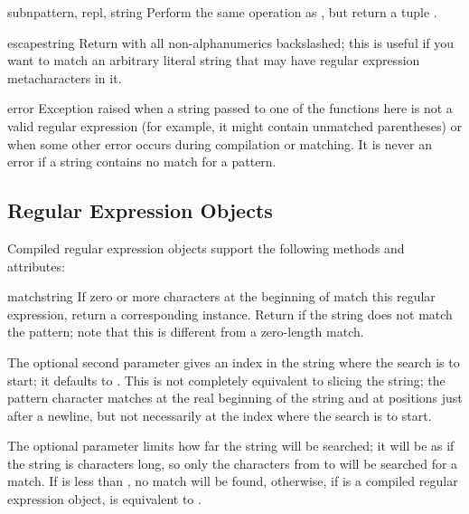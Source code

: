 \begin{funcdesc}{subn}{pattern, repl, string}
  Perform the same operation as , but return a tuple
  .
\end{funcdesc}

\begin{funcdesc}{escape}{string}
  Return  with all non-alphanumerics backslashed; this is
  useful if you want to match an arbitrary literal string that may have
  regular expression metacharacters in it.
\end{funcdesc}

\begin{excdesc}{error}
  Exception raised when a string passed to one of the functions here
  is not a valid regular expression (for example, it might contain
  unmatched parentheses) or when some other error occurs during
  compilation or matching.  It is never an error if a string contains
  no match for a pattern.
\end{excdesc}


\subsection{Regular Expression Objects \label{re-objects}}

Compiled regular expression objects support the following methods and
attributes:

\begin{methoddesc}[RegexObject]{match}{string}
  If zero or more characters at the beginning of  match
  this regular expression, return a corresponding
   instance.  Return  if the string does not
  match the pattern; note that this is different from a zero-length
  match.


  The optional second parameter  gives an index in the string
  where the search is to start; it defaults to .  This is not
  completely equivalent to slicing the string; the
   pattern
  character matches at the real beginning of the string and at positions
  just after a newline, but not necessarily at the index where the search
  is to start.

  The optional parameter  limits how far the string will
  be searched; it will be as if the string is  characters
  long, so only the characters from  to  will be searched for a match.  If  is less than
  , no match will be found, otherwise, if  is a
  compiled regular expression object,
   is equivalent to
  .
\end{methoddesc}

